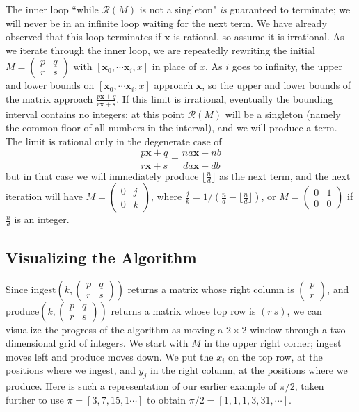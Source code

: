 \documentclass[11pt, oneside]{amsart}   	%
\newcommand{\pqrs}{\left(
\begin{smallmatrix} 
p & q\\ 
r & s 
\end{smallmatrix}
\right)}
\renewcommand{\:}{\negthickspace:\negthickspace}
\begin{document}
The inner loop ``while $\mathcal{R}(M)$ is not a singleton" \emph{is} guaranteed to terminate; we will never be in an infinite loop
waiting for the next term. We have already observed that this loop terminates if $\mathbf{x}$ is rational, so assume it is irrational. As
we iterate through the inner loop, we are repeatedly rewriting the initial $M = \pqrs$
with $[\mathbf{x}_0, \cdots \mathbf{x}_i, x]$ in place of $x$. As $i$ goes to infinity, the upper and lower bounds on
$[\mathbf{x}_0, \cdots \mathbf{x}_i, x]$ approach $\mathbf{x}$, so the upper and lower bounds of the matrix approach
$\frac{p\mathbf{x}+q}{r\mathbf{x}+s}$.
If this limit is irrational, eventually the bounding interval contains no integers; at this point $\mathcal{R}(M)$  will be a singleton
(namely the common floor of all numbers in the interval), and we will produce a term. The limit is rational only in the degenerate case
of
\[
\frac{p\mathbf{x}+q}{r\mathbf{x}+s} = \frac{na\mathbf{x}+nb}{da\mathbf{x}+db}
\]
but in that case we will immediately produce $\lfloor \frac{n}{d} \rfloor$ as the next term,
and the next iteration will have $M =\left(
\begin{smallmatrix} 
0 & j\\ 
0 & k 
\end{smallmatrix}
\right)$, where $\frac{j}{k} = 1/(\frac{n}{d}  -\lfloor \frac{n}{d} \rfloor)$, or $M = \left(\begin{smallmatrix}0 & 1 \\ 0 & 0\end{smallmatrix}\right)$ if $\frac{n}{d}$ is an integer.

\subsection{Visualizing the Algorithm}
Since $\mbox{ingest}(k,\pqrs)$ returns a matrix whose right column is
$\left( \begin{smallmatrix} p \\  r \end{smallmatrix}\right)$,
and $\mbox{produce}(k,\pqrs)$ returns a matrix whose top row is $(r\ s)$, we can visualize the progress of the algorithm
as moving a $2 \times 2$ window through a two-dimensional grid of integers.
We start with $M$ in the upper right corner; ingest moves left and produce moves down.
We put the $x_i$ on the top row, at the positions where we ingest, and $y_j$ in the right column, at the positions where we produce.
Here is such a representation of our earlier example of $\pi/2$, taken further to use $\pi = [3,7,15, 1\cdots]$ to obtain $\pi/2 = [1,1,1,3,31,\cdots]$.
\end{document}
